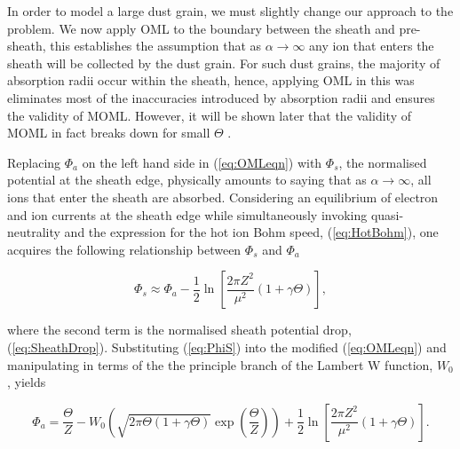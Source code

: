 \documentclass{article}
\begin{document}
\medskip

In order to model a large dust grain, we must slightly change our approach to the problem.
We now apply OML to the boundary between the sheath and pre-sheath, this establishes
the assumption that as $\alpha \to \infty$ any ion that enters the sheath will be 
collected by the dust grain. For such dust grains, the majority of absorption
radii occur within the sheath, hence, applying OML in this was eliminates most of the inaccuracies introduced 
by absorption radii and ensures the validity of MOML. However, it will be shown later that the validity of MOML in fact breaks down for small
$\Theta$ \cite{Thomas}. 

\medskip

Replacing $\Phi_a$ on the left hand side in (\ref{eq:OMLeqn}) with $\Phi_s$, the normalised potential
at the sheath edge, physically amounts to
saying that as $\alpha \to \infty$, all ions that enter the sheath are absorbed. Considering an equilibrium of
electron and ion currents at the sheath edge while simultaneously invoking quasi-neutrality 
and the expression for the hot ion Bohm speed, (\ref{eq:HotBohm}), one acquires the following 
relationship between $\Phi_s$ and $\Phi_a$

\begin{equation}\label{eq:PhiS}
\Phi_s \approx \Phi_a - \frac{1}{2}\ln{\left[\frac{2\pi Z^2}{\mu^2}(1 + \gamma \Theta)\right]},
\end{equation}

\noindent where the second term is the normalised sheath potential drop, (\ref{eq:SheathDrop}).
Substituting (\ref{eq:PhiS}) into the modified (\ref{eq:OMLeqn}) and manipulating in terms of
the the principle branch of the Lambert W function, $W_0$, yields 

\begin{equation}\label{eq:MOMLsol}
\Phi_a =  \frac{\Theta}{Z} - W_{0}\left(\sqrt{2\pi \Theta (1 + \gamma \Theta)} \exp{\left (\frac{\Theta}{Z}\right)}\right) + \frac{1}{2}\ln{\left[\frac{2\pi Z^2}{\mu^2}(1 + \gamma \Theta)\right]}.
\end{equation}

\newpage
\end{document}
